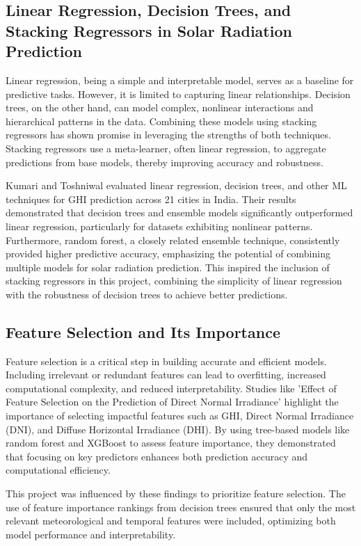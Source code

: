 \documentclass[10pt,twocolumn]{article}
\begin{document}
\subsection{Linear Regression, Decision Trees, and Stacking Regressors in Solar Radiation Prediction}
Linear regression, being a simple and interpretable model, serves as a baseline for predictive tasks. However, it is limited to capturing linear relationships. Decision trees, on the other hand, can model complex, nonlinear interactions and hierarchical patterns in the data. Combining these models using stacking regressors has shown promise in leveraging the strengths of both techniques. Stacking regressors use a meta-learner, often linear regression, to aggregate predictions from base models, thereby improving accuracy and robustness.

Kumari and Toshniwal \cite{14} evaluated linear regression, decision trees, and other ML techniques for GHI prediction across 21 cities in India. Their results demonstrated that decision trees and ensemble models significantly outperformed linear regression, particularly for datasets exhibiting nonlinear patterns. Furthermore, random forest, a closely related ensemble technique, consistently provided higher predictive accuracy, emphasizing the potential of combining multiple models for solar radiation prediction. This inspired the inclusion of stacking regressors in this project, combining the simplicity of linear regression with the robustness of decision trees to achieve better predictions.

\subsection{Feature Selection and Its Importance}
Feature selection is a critical step in building accurate and efficient models. Including irrelevant or redundant features can lead to overfitting, increased computational complexity, and reduced interpretability. Studies like 'Effect of Feature Selection on the Prediction of
Direct Normal Irradiance' \cite{4} highlight the importance of selecting impactful features such as GHI, Direct Normal Irradiance (DNI), and Diffuse Horizontal Irradiance (DHI). By using tree-based models like random forest and XGBoost to assess feature importance, they demonstrated that focusing on key predictors enhances both prediction accuracy and computational efficiency.

This project was influenced by these findings to prioritize feature selection. The use of feature importance rankings from decision trees ensured that only the most relevant meteorological and temporal features were included, optimizing both model performance and interpretability.
\end{document}

